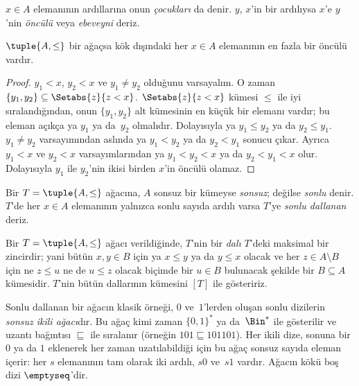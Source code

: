$x \in A$ elemanının ardıllarına onun \emph{çocukları} da denir. $y$, $x$'in bir
ardılıysa $x$'e $y$'nin \emph{öncülü} veya \emph{ebeveyni} deriz.

\begin{prop}
$\tuple{A,\le}$ bir ağaçsa kök dışındaki her $x \in A$ elemanının en fazla bir
öncülü vardır.
\end{prop}

\begin{proof}
  $y_1<x$, $y_2<x$ ve $y_1\neq y_2$ olduğunu varsayalım. O zaman
  $\{y_1,y_2\}\subseteq\Setabs{z}{z<x}$. $\Setabs{z}{z<x}$ kümesi $\le$ ile
  iyi sıralandığından, onun $\{y_1,y_2\}$ alt kümesinin en küçük bir elemanı
  vardır; bu eleman açıkça ya $y_1$ ya da~$y_2$ olmalıdır. Dolayısıyla ya
  $y_1\le y_2$ ya da $y_2\le y_1$. $y_1\neq y_2$ varsayımından aslında ya
  $y_1<y_2$ ya da $y_2<y_1$ sonucu çıkar. Ayrıca $y_1<x$ ve $y_2<x$
  varsayımlarından ya $y_1<y_2<x$ ya da $y_2<y_1<x$ olur. Dolayısıyla $y_1$
  ile $y_2$'nin ikisi birden $x$'in öncülü olamaz.
\end{proof}

\begin{defn}
Bir $T=\tuple{A,\le}$ ağacına, $A$ sonsuz bir kümeyse \emph{sonsuz}; değilse
\emph{sonlu} denir. $T$'de her $x \in A$ elemanının yalnızca sonlu sayıda ardılı
varsa $T$'ye \emph{sonlu dallanan} deriz.
\end{defn}

\begin{defn}[Dallar]
Bir $T=\tuple{A,\le}$ ağacı verildiğinde, $T$'nin bir \emph{dalı} $T$'deki
maksimal bir zincirdir; yani bütün $x,y \in B$ için ya $x\le y$ ya da
$y\le x$ olacak ve her $z \in A\setminus B$ için ne $z\le u$ ne de $u\le z$
olacak biçimde bir $u \in B$ bulunacak şekilde bir $B \subseteq A$ kümesidir.
%
$T$'nin bütün dallarının kümesini $[T]$ ile gösteririz.
\end{defn}

\begin{ex}
Sonlu dallanan bir ağacın klasik örneği, $0$ ve~$1$'lerden oluşan sonlu
dizilerin \emph{sonsuz ikili ağacı}dır. Bu ağaç kimi zaman $\{0,1\}^*$ ya
da~$\Bin^*$ ile gösterilir ve uzantı bağıntısı $\sqsubseteq$ ile sıralanır
(örneğin $101 \sqsubseteq 101101$). Her ikili dize, sonuna bir $0$ ya da $1$
eklenerek her zaman uzatılabildiği için bu ağaç sonsuz sayıda eleman içerir:
her $s$ elemanının tam olarak iki ardılı, $s0$ ve~$s1$ vardır. Ağacın kökü boş
dizi $\emptyseq$'dir.
\end{ex}

